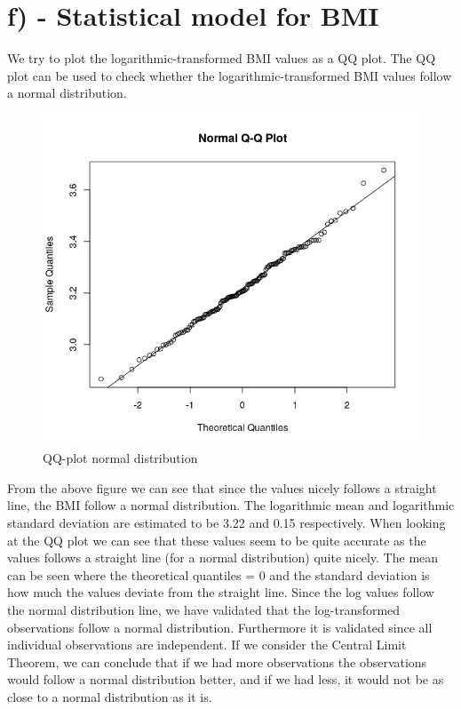 \documentclass{memoir}
\begin{document}
\section{f) - Statistical model for BMI}
We try to plot the logarithmic-transformed BMI values as a QQ plot. The QQ plot can be used to check whether the logarithmic-transformed BMI values follow a normal distribution. 
\begin{figure}[H]
	\centering
	\includegraphics[scale=0.6]{qqplot1.png}
	\caption{QQ-plot normal distribution}
\end{figure}
From the above figure we can see that since the values nicely follows a straight line, the BMI follow a normal distribution.
The logarithmic mean and logarithmic standard deviation are estimated to be 3.22 and 0.15 respectively. When looking at the QQ plot we can see that these values seem to be quite accurate as the values follows a straight line (for a normal distribution) quite nicely. The mean can be seen where the theoretical quantiles = 0 and the standard deviation is how much the values deviate from the straight line. 
Since the log values follow the normal distribution line, we have validated that the log-transformed observations follow a normal distribution. Furthermore it is validated since all individual observations are independent. 
If we consider the Central Limit Theorem, we can conclude that if we had more observations the observations would follow a normal distribution better, and if we had less, it would not be as close to a normal distribution as it is. 
\end{document}
